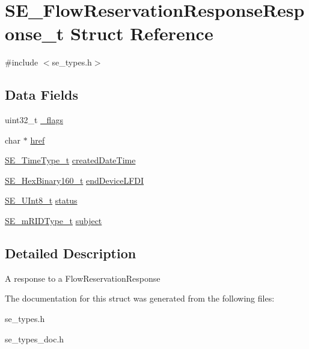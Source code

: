\hypertarget{structSE__FlowReservationResponseResponse__t}{}\section{S\+E\+\_\+\+Flow\+Reservation\+Response\+Response\+\_\+t Struct Reference}
\label{structSE__FlowReservationResponseResponse__t}


{\ttfamily \#include $<$se\+\_\+types.\+h$>$}

\subsection*{Data Fields}
\begin{DoxyCompactItemize}
\item 
uint32\+\_\+t \hyperlink{group__FlowReservationResponseResponse_ga5af129d77c9a560502066c75c4fb7619}{\+\_\+flags}
\item 
char $\ast$ \hyperlink{group__FlowReservationResponseResponse_gadab170c7a69f833a7b7db7247f400305}{href}
\item 
\hyperlink{group__TimeType_ga6fba87a5b57829b4ff3f0e7638156682}{S\+E\+\_\+\+Time\+Type\+\_\+t} \hyperlink{group__FlowReservationResponseResponse_ga12b80e3dcd3a5d9220c7582193c97ae4}{created\+Date\+Time}
\item 
\hyperlink{group__HexBinary160_ga92b92aa55555bdb75f3a59060f2c1632}{S\+E\+\_\+\+Hex\+Binary160\+\_\+t} \hyperlink{group__FlowReservationResponseResponse_gaf78fcf5a4bf4fb48da0fe100d4d37980}{end\+Device\+L\+F\+DI}
\item 
\hyperlink{group__UInt8_gaf7c365a1acfe204e3a67c16ed44572f5}{S\+E\+\_\+\+U\+Int8\+\_\+t} \hyperlink{group__FlowReservationResponseResponse_ga5ecdbb63ff59d85cf982562cec5c3a5a}{status}
\item 
\hyperlink{group__mRIDType_gac74622112f3a388a2851b2289963ba5e}{S\+E\+\_\+m\+R\+I\+D\+Type\+\_\+t} \hyperlink{group__FlowReservationResponseResponse_ga177ff4d3fb0d3e1ece98061c9bcfcb6c}{subject}
\end{DoxyCompactItemize}


\subsection{Detailed Description}
A response to a Flow\+Reservation\+Response 

The documentation for this struct was generated from the following files\+:\begin{DoxyCompactItemize}
\item 
se\+\_\+types.\+h\item 
se\+\_\+types\+\_\+doc.\+h\end{DoxyCompactItemize}
